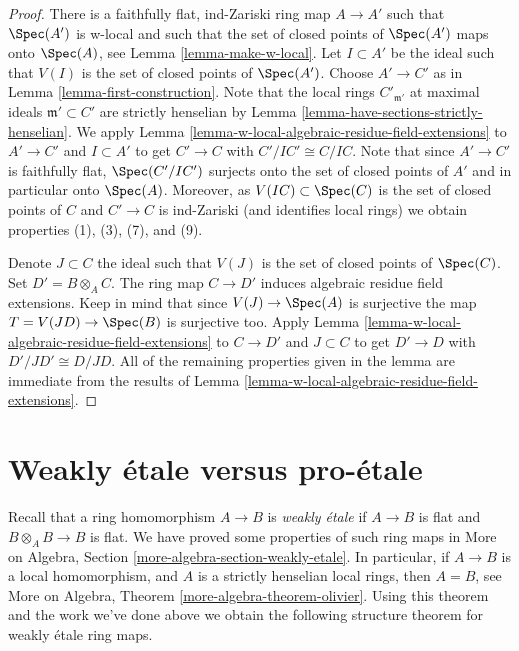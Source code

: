 \begin{proof}
There is a faithfully flat, ind-Zariski ring map $A \to A'$ such that
$\Spec(A')$ is w-local and such that the set of closed points of
$\Spec(A')$ maps onto $\Spec(A)$, see Lemma \ref{lemma-make-w-local}.
Let $I \subset A'$ be the ideal such that $V(I)$ is the set
of closed points of $\Spec(A')$.
Choose $A' \to C'$ as in Lemma \ref{lemma-first-construction}.
Note that the local rings $C'_{\mathfrak m'}$ at maximal ideals
$\mathfrak m' \subset C'$ are strictly henselian by
Lemma \ref{lemma-have-sections-strictly-henselian}.
We apply Lemma \ref{lemma-w-local-algebraic-residue-field-extensions}
to $A' \to C'$ and $I \subset A'$ to get $C' \to C$ with $C'/IC' \cong C/IC$.
Note that since $A' \to C'$ is faithfully flat, $\Spec(C'/IC')$
surjects onto the set of closed points of $A'$ and in particular
onto $\Spec(A)$. Moreover, as $V(IC) \subset \Spec(C)$
is the set of closed points of $C$ and $C' \to C$ is ind-Zariski
(and identifies local rings) we obtain properties (1), (3), (7), and (9).

\medskip\noindent
Denote $J \subset C$ the ideal such that $V(J)$ is the set of closed
points of $\Spec(C)$. Set $D' = B \otimes_A C$. The ring
map $C \to D'$ induces algebraic residue field extensions. Keep in mind that
since $V(J) \to \Spec(A)$ is surjective the map $T = V(JD) \to \Spec(B)$
is surjective too. Apply
Lemma \ref{lemma-w-local-algebraic-residue-field-extensions}
to $C \to D'$ and $J \subset C$ to get 
$D' \to D$ with $D'/JD' \cong D/JD$.
All of the remaining properties given in the lemma are
immediate from the results of
Lemma \ref{lemma-w-local-algebraic-residue-field-extensions}.
\end{proof}








\section{Weakly \'etale versus pro-\'etale}
\label{section-weakly-etale}

\noindent
Recall that a ring homomorphism $A \to B$ is {\it weakly \'etale}
if $A \to B$ is flat and $B \otimes_A B \to B$ is flat. We have
proved some properties of such ring maps in
More on Algebra, Section \ref{more-algebra-section-weakly-etale}.
In particular, if $A \to B$ is a local homomorphism, and $A$ is a
strictly henselian local rings, then $A = B$, see
More on Algebra, Theorem \ref{more-algebra-theorem-olivier}.
Using this theorem and the work we've done above we obtain
the following structure theorem for weakly \'etale ring maps.


